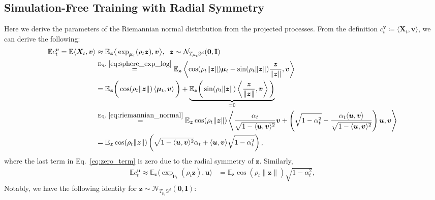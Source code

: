 \subsection{Simulation-Free Training with Radial Symmetry} \label{app:derivation:coord_alpha}

Here we derive the parameters of the Riemannian normal distribution from the projected processes.
From the definition $c^{\bm{v}}_t\coloneqq \langle \bm{X}_t, \bm{v}\rangle$, we can derive the following:
\begin{align}
    \mathbb{E}c^{\bm{v}}_t = \mathbb{E} \langle\bm{X}_t, \bm{v} \rangle &\approx \mathbb{E}_{\bm{z}} \big\langle\exp_{\bm{\mu}_t}(\rho_t \bm{z}), \bm{v} \big\rangle, \;\; \bm{z}\sim \mathcal{N}_{T_{\bm{\mu}_t}\mathbb{S}^d}(\mathbf{0}, \mathbf{I}) \\
    &\stackrel{\text{Eq.}~\eqref{eq:sphere_exp_log}}{\phantom{..}=\phantom{..}}
    \mathbb{E}_{\bm{z}}\left\langle \cos(\rho_t\|\bm{z}\|)\bm{\mu}_t + \sin(\rho_t\|\bm{z}\|)\frac{\bm{z}}{\|\bm{z}\|}, \bm{v} \right\rangle \\
    &= \mathbb{E}_{\bm{z}}\bigg(\cos(\rho_t\|\bm{z}\|) \left\langle \bm{\mu}_t, \bm{v}\right\rangle \bigg) 
    + \underbrace{\mathbb{E}_{\bm{z}}\bigg( \sin(\rho_t\|\bm{z}\|) \left\langle \frac{\bm{z}}{\|\bm{z}\|}, \bm{v} \right\rangle\bigg)}_{=0} \label{eq:zero_term} \\
    &\stackrel{\text{Eq.}~\eqref{eq:riemannian_normal}}{\phantom{..}=\phantom{..}} 
    \mathbb{E}_{\bm{z}}\cos(\rho_t\|\bm{z}\|) \left\langle
        \frac{\alpha_t}{\sqrt{1 - \langle \bm{u}, \bm{v}\rangle^2}}\bm{v} + 
        \left(\sqrt{1-\alpha_t^2} - \frac{\alpha_t\langle \bm{u}, \bm{v}\rangle}{\sqrt{1 - \langle \bm{u}, \bm{v}\rangle^2}}\right)\bm{u}
    , \bm{v}\right\rangle \\
    &= \mathbb{E}_{\bm{z}}\cos(\rho_t\|\bm{z}\|) 
    \left( 
        \sqrt{1 - \langle \bm{u}, \bm{v}\rangle^2}\alpha_t + \langle \bm{u}, \bm{v}\rangle \sqrt{1 - \alpha_t^2}
    \right),
\end{align}
where the last term in Eq.~\eqref{eq:zero_term} is zero due to the radial symmetry of $\bm{z}$. 
Similarly, 
\begin{align}
     \mathbb{E}c^{\bm{u}}_t \approx \mathbb{E}_{\bm{z}} \langle\exp_{\bm{\mu}_t}(\rho_t \bm{z}), \bm{u} \rangle 
    &= \mathbb{E}_{\bm{z}}\cos(\rho_t\|\bm{z}\|) \sqrt{1 - \alpha_t^2},
\end{align}
Notably, we have the following identity for $\bm{z}\sim\mathcal{N}_{T_{\bm{\mu}_t}\mathbb{S}^d}(\mathbf{0}, \mathbf{I})$:
